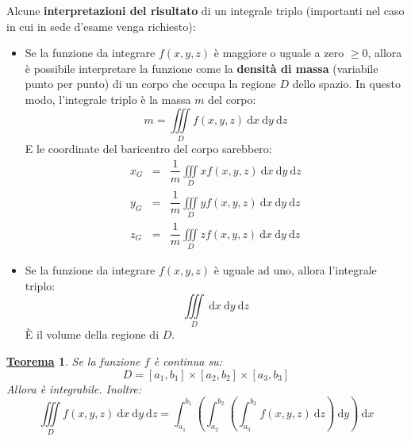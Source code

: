 \documentclass[a4paper]{article}
\newtheorem{theorem}{\textcolor{Red3}{\underline{Teorema}}}
\newcommand{\definition}[1]{\textcolor{Red3}{\textbf{#1}}}
\begin{document}
	\noindent
	Alcune \definition{interpretazioni del risultato} di un integrale triplo (importanti nel caso in cui in sede d'esame venga richiesto):
	\begin{itemize}
		\item Se la funzione da integrare $f\left(x,y,z\right)$ è maggiore o uguale a zero $\ge 0$, allora è possibile interpretare la funzione come la \textbf{densità di massa} (variabile punto per punto) di un corpo che occupa la regione $D$ dello spazio. In questo modo, l'integrale triplo è la massa $m$ del corpo:
		\begin{equation}\label{eq: densità di massa}
			m = \displaystyle\iiint\limits_{D} f\left(x,y,z\right) \:\mathrm{d}x\:\mathrm{d}y\:\mathrm{d}z
		\end{equation}
		E le coordinate del baricentro del corpo sarebbero:
		\begin{equation}\label{eq: coordinate del baricentro}
			\begin{array}{rcl}
				x_{G} &=& \dfrac{1}{m} \displaystyle\iiint\limits_{D} x f\left(x,y,z\right) \:\mathrm{d}x\:\mathrm{d}y\:\mathrm{d}z \\ [2em]
				y_{G} &=& \dfrac{1}{m} \displaystyle\iiint\limits_{D} y f\left(x,y,z\right) \:\mathrm{d}x\:\mathrm{d}y\:\mathrm{d}z \\ [2em]
				z_{G} &=& \dfrac{1}{m} \displaystyle\iiint\limits_{D} z f\left(x,y,z\right) \:\mathrm{d}x\:\mathrm{d}y\:\mathrm{d}z
			\end{array}
		\end{equation}

		\item Se la funzione da integrare $f\left(x,y,z\right)$ è uguale ad uno, allora l'integrale triplo:
		\begin{equation}\label{eq: integrale triplo - volume}
			\displaystyle\iiint\limits_{D} \:\mathrm{d}x\:\mathrm{d}y\:\mathrm{d}z
		\end{equation}
		È il volume della regione di $D$.
	\end{itemize}
	
	\begin{theorem}\label{theorem: integrali tripli}
		Se la funzione $f$ è continua su:
		\begin{equation*}
			D = \left[a_{1}, b_{1}\right] \times \left[a_{2}, b_{2}\right] \times \left[a_{3}, b_{3}\right]
		\end{equation*}
		Allora è integrabile. Inoltre:
		\begin{equation}
			\displaystyle\iiint\limits_{D} f\left(x,y,z\right) \:\mathrm{d}x\:\mathrm{d}y\:\mathrm{d}z 
			= 
			\displaystyle\int_{a_{1}}^{b_{1}} \left(\int_{a_{2}}^{b_{2}} \left(\int_{a_{3}}^{b_{3}} f\left(x,y,z\right) \:\mathrm{d}z\right) \: \mathrm{d}y\right) \:\mathrm{d}x
		\end{equation}
	\end{theorem}
\end{document}
